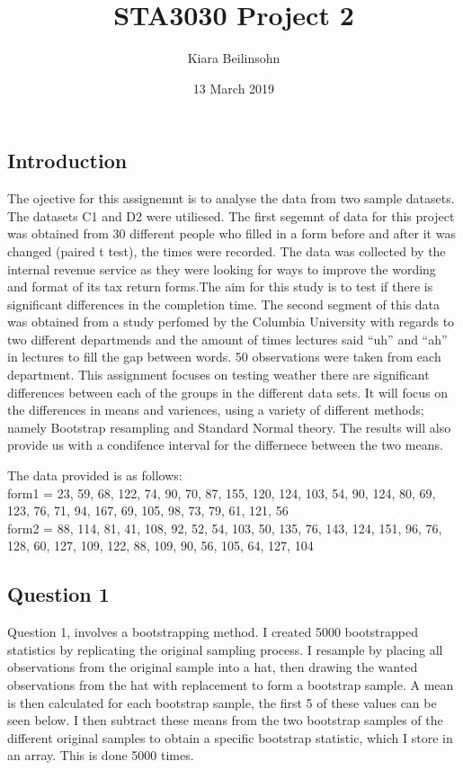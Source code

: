 \documentclass[]{article}
\title{STA3030 Project 2}
\author{Kiara Beilinsohn}
\date{13 March 2019}
\begin{document}
\maketitle

\subsection{Introduction}\label{introduction}

The ojective for this assignemnt is to analyse the data from two sample
datasets. The datasets C1 and D2 were utiliesed. The first segemnt of
data for this project was obtained from 30 different people who filled
in a form before and after it was changed (paired t test), the times
were recorded. The data was collected by the internal revenue service as
they were looking for ways to improve the wording and format of its tax
return forms.The aim for this study is to test if there is significant
differences in the completion time. The second segment of this data was
obtained from a study perfomed by the Columbia University with regards
to two different departmends and the amount of times lectures said
``uh'' and ``ah'' in lectures to fill the gap between words. 50
observations were taken from each department. This assignment focuses on
testing weather there are significant differences between each of the
groups in the different data sets. It will focus on the differences in
means and variences, using a variety of different methods; namely
Bootstrap resampling and Standard Normal theory. The results will also
provide us with a condifence interval for the differnece between the two
means.

The data provided is as follows:\\
form1 = 23, 59, 68, 122, 74, 90, 70, 87, 155, 120, 124, 103, 54, 90,
124, 80, 69, 123, 76, 71, 94, 167, 69, 105, 98, 73, 79, 61, 121, 56\\
form2 = 88, 114, 81, 41, 108, 92, 52, 54, 103, 50, 135, 76, 143, 124,
151, 96, 76, 128, 60, 127, 109, 122, 88, 109, 90, 56, 105, 64, 127, 104

\subsection{Question 1}\label{question-1}

Question 1, involves a bootstrapping method. I created 5000 bootstrapped
statistics by replicating the original sampling process. I resample by
placing all observations from the original sample into a hat, then
drawing the wanted observations from the hat with replacement to form a
bootstrap sample. A mean is then calculated for each bootstrap sample,
the first 5 of these values can be seen below. I then subtract these
means from the two bootstrap samples of the different original samples
to obtain a specific bootstrap statistic, which I store in an array.
This is done 5000 times.
\end{document}
